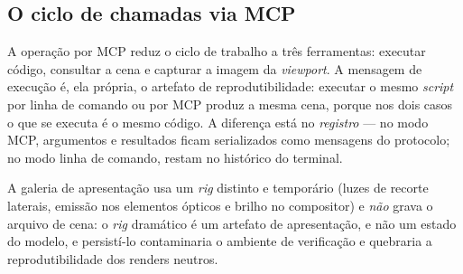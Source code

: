 \subsection{O ciclo de chamadas via MCP}

A opera\c{c}\~ao por MCP reduz o ciclo de trabalho a tr\^es ferramentas: executar
c\'odigo, consultar a cena e capturar a imagem da \emph{viewport}. A mensagem de
execu\c{c}\~ao \'e, ela pr\'opria, o artefato de reprodutibilidade: executar o mesmo
\emph{script} por linha de comando ou por MCP produz a mesma cena, porque nos dois casos o
que se executa \'e o mesmo c\'odigo. A diferen\c{c}a est\'a no \emph{registro} --- no modo
MCP, argumentos e resultados ficam serializados como mensagens do protocolo; no modo linha
de comando, restam no hist\'orico do terminal.

A galeria de apresenta\c{c}\~ao usa um \emph{rig} distinto e tempor\'ario (luzes de
recorte laterais, emiss\~ao nos elementos \'opticos e brilho no compositor) e
\emph{n\~ao} grava o arquivo de cena: o \emph{rig} dram\'atico \'e um artefato de
apresenta\c{c}\~ao, e n\~ao um estado do modelo, e persist\'i-lo contaminaria o ambiente
de verifica\c{c}\~ao e quebraria a reprodutibilidade dos renders neutros.
